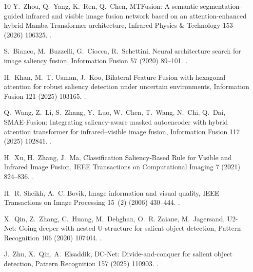 \begin{thebibliography}{10}
Y.~Zhou, Q.~Yang, K.~Ren, Q.~Chen, {MTFusion: A semantic segmentation-guided
  infrared and visible image fusion network based on an attention-enhanced
  hybrid Mamba-Transformer architecture}, Infrared Physics \& Technology 153
  (2026) 106325.
\newblock \href {https://doi.org/10.1016/j.infrared.2025.106325}
  {}.

S.~Bianco, M.~Buzzelli, G.~Ciocca, R.~Schettini, {Neural architecture search
  for image saliency fusion}, Information Fusion 57 (2020) 89--101.
\newblock \href {https://doi.org/10.1016/j.inffus.2019.12.007}
  {}.

H.~Khan, M.~T. Usman, J.~Koo, {Bilateral Feature Fusion with hexagonal
  attention for robust saliency detection under uncertain environments},
  Information Fusion 121 (2025) 103165.
\newblock \href {https://doi.org/10.1016/j.inffus.2025.103165}
  {}.

Q.~Wang, Z.~Li, S.~Zhang, Y.~Luo, W.~Chen, T.~Wang, N.~Chi, Q.~Dai,
  {SMAE-Fusion: Integrating saliency-aware masked autoencoder with hybrid
  attention transformer for infrared–visible image fusion}, Information
  Fusion 117 (2025) 102841.
\newblock \href {https://doi.org/10.1016/j.inffus.2024.102841}
  {}.

H.~Xu, H.~Zhang, J.~Ma, {Classification Saliency-Based Rule for Visible and
  Infrared Image Fusion}, IEEE Transactions on Computational Imaging 7 (2021)
  824--836.
\newblock \href {https://doi.org/10.1109/tci.2021.3100986}
  {}.

H.~R. Sheikh, A.~C. Bovik, {Image information and visual quality}, IEEE
  Transactions on Image Processing 15~(2) (2006) 430--444.
\newblock \href {https://doi.org/10.1109/TIP.2005.859378}
  {}.

X.~Qin, Z.~Zhang, C.~Huang, M.~Dehghan, O.~R. Zaiane, M.~Jagersand, {U2-Net:
  Going deeper with nested U-structure for salient object detection}, Pattern
  Recognition 106 (2020) 107404.
\newblock \href {https://doi.org/10.1016/j.patcog.2020.107404}
  {}.

J.~Zhu, X.~Qin, A.~Elsaddik, {DC-Net: Divide-and-conquer for salient object
  detection}, Pattern Recognition 157 (2025) 110903.
\newblock \href {https://doi.org/10.1016/j.patcog.2024.110903}
  {}.


\end{thebibliography}
